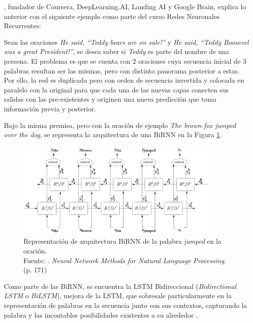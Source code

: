 \begin{itemize}
\begin{itemize}
		\cite{tec_ng2018bidirectionalRNN}, fundador de Coursera, DeepLearning.AI, Landing AI y Google Brain, explica lo anterior con el siguiente ejemplo como parte del curso Redes Neuronales Recurrentes:
		
		Sean las oraciones \textit{He said, “Teddy bears are on sale!”} y \textit{He said, “Teddy Roosevel was a great President!”}, se desea saber si \textit{Teddy} es parte del nombre de una persona. El problema es que se cuenta con 2 oraciones cuya secuencia inicial de 3 palabras resultan ser las mismas, pero con distinto panorama posterior a estas. Por ello, la red es duplicada pero con orden de secuencia invertida y colocada en paralelo con la original para que cada una de las nuevas capas conecten sus salidas con las pre-existentes y originen una nueva predicción que toma información previa y posterior.
		
		Bajo la misma premisa, pero con la oración de ejemplo \textit{The brown fox jumped over the dog}, se representa la arquitectura de una BiRNN en la Figura \ref{2:fig44}.
		
		\begin{figure}[!ht]
			\begin{center}
				\includegraphics[width=0.90\textwidth]{2/figures/birnn_architecture.jpg}
				\caption[Representación de arquitectura BiRNN de la palabra \textit{jumped} en la oración]{Representación de arquitectura BiRNN de la palabra \textit{jumped} en la oración.\\
				Fuente: \cite{bk_goldberg2017nn_nlp}. \textit{Neural Network Methods for Natural Language Processing}. (p. 171)}
				\label{2:fig44}
			\end{center}
		\end{figure}
		
		Como parte de las BiRNN, se encuentra la LSTM Bidireccional (\textit{Bidirectional LSTM} o \textit{BiLSTM}), mejora de la LSTM, que sobresale particularmente en la representación de palabras en la secuencia junto con sus contextos, capturando la palabra y las incontables posibilidades existentes a su alrededor \parencite{bk_deng2018deeplearningnlp}.
		

\end{itemize}
\end{itemize}
